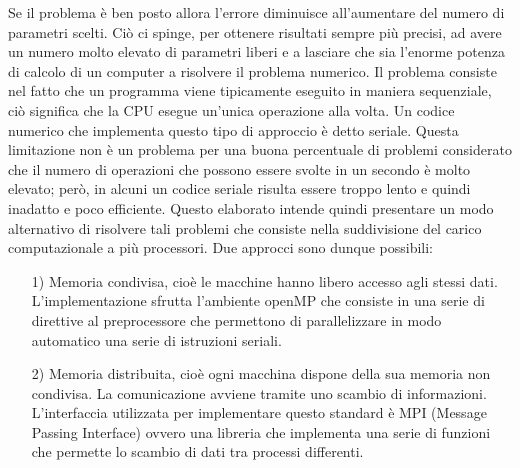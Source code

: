 \documentclass[italian]{article}
\begin{document}
Se il problema è ben posto allora l’errore diminuisce all’aumentare del numero di parametri scelti. Ciò ci spinge, per ottenere risultati sempre più precisi, ad avere un numero molto elevato di parametri liberi e a lasciare che sia l’enorme potenza di calcolo di un computer a risolvere il problema numerico. Il problema consiste nel fatto che un programma viene tipicamente eseguito in maniera sequenziale, ciò significa che la CPU esegue un'unica operazione alla volta. Un codice numerico che implementa questo tipo di approccio è detto seriale. Questa limitazione non è un problema per una buona percentuale di problemi considerato che il numero di operazioni che possono essere svolte in un secondo è molto elevato; però, in alcuni un codice seriale risulta essere troppo lento e quindi inadatto e poco efficiente. Questo elaborato intende quindi presentare un modo alternativo di risolvere tali problemi che consiste nella suddivisione del carico computazionale a più processori. Due approcci sono dunque possibili:
\begin{enumerate}
\item[1)] Memoria condivisa, cioè le macchine hanno libero accesso agli stessi dati. L'implementazione sfrutta l'ambiente openMP che consiste in una serie di direttive al preprocessore che permettono di parallelizzare in modo automatico una serie di istruzioni seriali.
\item[2)]Memoria distribuita, cioè ogni macchina dispone della sua memoria non condivisa. La comunicazione avviene tramite uno scambio di informazioni. L'interfaccia utilizzata per implementare questo standard è MPI (Message Passing Interface) ovvero una libreria che implementa una serie di funzioni che permette lo scambio di dati tra processi differenti.
\end{enumerate}
\end{document}
